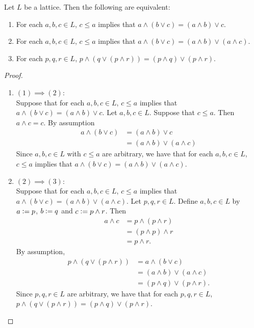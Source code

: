 \documentclass{book}
\begin{document}
	\begin{ex}
		Let $L$ be a lattice. Then the following are equivalent:
		\begin{enumerate}
			\item For each $a,b,c \in L$, $c \leq a$ implies that $a \wedge (b \vee c) = (a \wedge b) \vee c$.
			\item For each $a,b,c \in L$, $c \leq a$ implies that $a \wedge (b \vee c) = (a \wedge b) \vee (a \wedge c)$.
			\item For each $p,q,r \in L$, $p \wedge (q \vee (p \wedge r)) = (p \wedge q) \vee (p \wedge r)$.
		\end{enumerate}
	\end{ex}
	
	\begin{proof}\
		\begin{enumerate}
			\item $(1) \implies (2)$: \\
			Suppose that for each $a,b,c \in L$, $c \leq a$ implies that $a \wedge (b \vee c) = (a \wedge b) \vee c$. Let $a,b,c \in L$. Suppose that $c \leq a$. Then $a \wedge c = c$. By assumption 
			\begin{align*}
				a \wedge (b \vee c) 
				& = (a \wedge b) \vee c \\
				& = (a \wedge b) \vee (a \wedge c)
			\end{align*}
			Since $a,b,c \in L$ with $c \leq a$ are arbitrary, we have that for each $a,b,c \in L$, $c \leq a$ implies that $a \wedge (b \vee c) = (a \wedge b) \vee (a \wedge c)$.
			\item $(2) \implies (3)$: \\
			Suppose that for each $a,b,c \in L$, $c \leq a$ implies that $a \wedge (b \vee c) = (a \wedge b) \vee (a \wedge c)$. Let $p,q,r \in L$. Define $a,b,c \in L$ by $a \vcentcolon= p$, $b \vcentcolon= q$ and $c \vcentcolon= p \wedge r$. Then 
			\begin{align*}
				a \wedge c
				& = p \wedge (p \wedge r) \\
				& = (p \wedge p) \wedge r \\
				& = p \wedge r.
			\end{align*}
			By assumption,
			\begin{align*}
				p \wedge (q \vee (p \wedge r))
				& = a \wedge (b \vee c) \\
				& = (a \wedge b) \vee (a \wedge c) \\
				& = (p \wedge q) \vee (p \wedge r).
			\end{align*}
			Since $p,q,r \in L$ are arbitrary, we have that for each $p,q,r \in L$, $p \wedge (q \vee (p \wedge r)) = (p \wedge q) \vee (p \wedge r)$.

\end{enumerate}
\end{proof}
\end{document}
